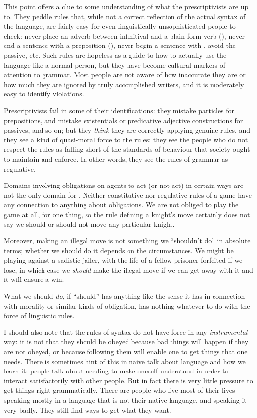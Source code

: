 \documentclass[output=paper]{langscibook}
\begin{document}
This point offers a clue to some understanding of what the prescriptivists are up to.  They peddle rules that, while not a correct reflection of the actual syntax of the language, are fairly easy for even linguistically unsophisticated people to check: never place an adverb between infinitival  and a plain-form verb (), never end a sentence with a preposition (), never begin a sentence with , avoid the passive, etc. Such rules are hopeless as a guide to how to actually use the language like a normal person, but they have become cultural markers of attention to grammar. Most people are not aware of how inaccurate they are or how much they are ignored by truly accomplished writers, and it is moderately easy to identify violations.

Prescriptivists fail in some of their identifications: they mistake particles for prepositions, and mistake existentials or predicative adjective constructions for passives, and so on; but they \emph{think} they are correctly applying genuine rules, and they see a kind of quasi-moral force to the rules: they see the people who do not respect the rules as falling short of the standards of behaviour that society ought to maintain and enforce.  In other words, they see the rules of grammar as regulative.

Domains involving obligations on agents to act (or not act) in certain ways are not the only domain for .  Neither constitutive nor regulative rules of a game have any connection to anything about obligations.  We are not obliged to play the game at all, for one thing, so the rule defining a knight's move certainly does not say we should or should not move any particular knight.

Moreover, making an illegal move is not something we ``shouldn't do'' in absolute terms; whether we should do it depends on the circumstances. We might be playing against a sadistic jailer, with the life of a fellow prisoner forfeited if we lose, in which case we \emph{should} make the illegal move if we can get away with it and it will ensure a win.

\largerpage[1]What we should \emph{do}, if ``should'' has anything like the sense it has in connection with morality or similar kinds of obligation, has nothing whatever to do with the  force of linguistic rules.

I should also note that the rules of syntax do not have  force in any \emph{instrumental} way: it is not that they should be obeyed because bad things will happen if they are not obeyed, or because following them will enable one to get things that one needs. There is sometimes hint of this in naive talk about language and how we learn it: people talk about needing to make oneself understood in order to interact satisfactorily with other people. But in fact there is very little pressure to get things right grammatically.  There are people who live most of their lives speaking mostly in a language that is not their native language, and speaking it very badly. They still find ways to get what they want.
\end{document}
